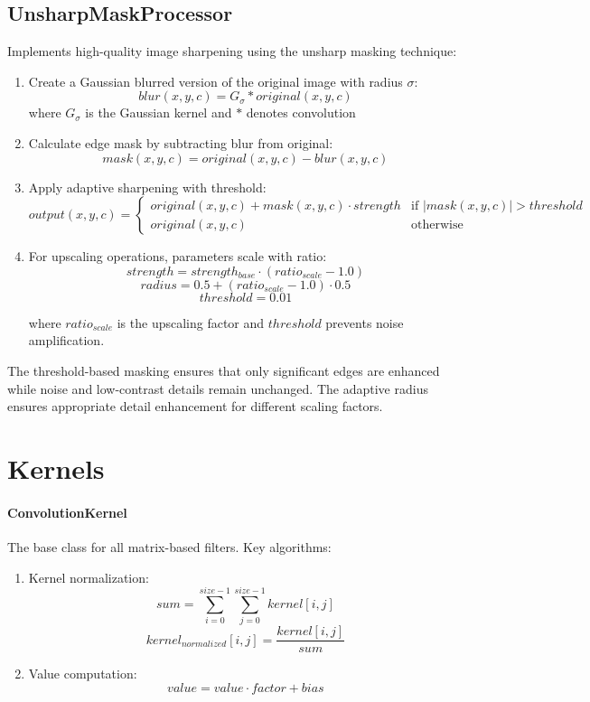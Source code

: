 \documentclass[12pt,a4paper]{report}
\begin{document}
\subsection{UnsharpMaskProcessor}
Implements high-quality image sharpening using the unsharp masking technique:
\begin{enumerate}
    \item Create a Gaussian blurred version of the original image with radius $\sigma$:
    \[ blur(x,y,c) = G_\sigma \ast original(x,y,c) \]
    where $G_\sigma$ is the Gaussian kernel and $\ast$ denotes convolution

    \item Calculate edge mask by subtracting blur from original:
    \[ mask(x,y,c) = original(x,y,c) - blur(x,y,c) \]

    \item Apply adaptive sharpening with threshold:
    \[ output(x,y,c) = \begin{cases} 
        original(x,y,c) + mask(x,y,c) \cdot strength & \text{if } |mask(x,y,c)| > threshold \\[2pt]
        original(x,y,c) & \text{otherwise}
    \end{cases} \]

    \item For upscaling operations, parameters scale with ratio:
    \[ strength = strength_{base} \cdot (ratio_{scale} - 1.0) \]
    \[ radius = 0.5 + (ratio_{scale} - 1.0) \cdot 0.5 \]
    \[ threshold = 0.01 \]

    where $ratio_{scale}$ is the upscaling factor and $threshold$ prevents noise amplification.
\end{enumerate}

The threshold-based masking ensures that only significant edges are enhanced while noise and low-contrast details remain unchanged. The adaptive radius ensures appropriate detail enhancement for different scaling factors.

\section{Kernels}

\paragraph{ConvolutionKernel}
The base class for all matrix-based filters. Key algorithms:
\begin{enumerate}
    \item Kernel normalization:
    \[ sum = \sum_{i=0}^{size-1} \sum_{j=0}^{size-1} kernel[i,j] \]
    \[ kernel_{normalized}[i,j] = \frac{kernel[i,j]}{sum} \]
    
    \item Value computation:
    \[ value = value \cdot factor + bias \]
\end{enumerate}
\end{document}
